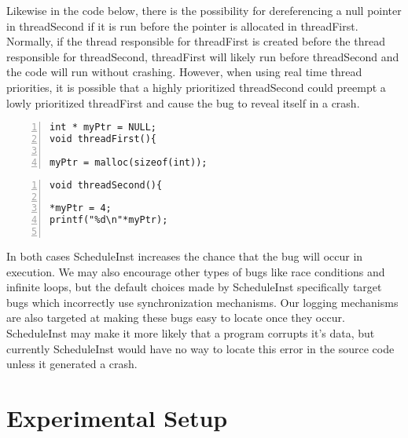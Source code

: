 \documentclass[10pt,]{article} %
\begin{document}
Likewise in the code below, there is the possibility for dereferencing a null pointer in threadSecond if it is run before the pointer is allocated in threadFirst.  Normally, if the thread responsible for threadFirst is created before the thread responsible for threadSecond, threadFirst will likely run before threadSecond and the code will run without crashing.  However, when using real time thread priorities, it is possible that a highly prioritized threadSecond could preempt a lowly prioritized threadFirst and cause the bug to reveal itself in a crash. 

\begin{minipage}[b]{0.45\linewidth}
\centering
\lstset{language=C,label=SliceExaple}
\begin{lstlisting}[frame=single,numbers=left, mathescape,%
  title={Bad Memory Access Thread 1}, label=scopesEnteredContents]
int * myPtr = NULL;
void threadFirst(){

myPtr = malloc(sizeof(int));
\end{lstlisting}
\end{minipage}
\hspace{0.5cm}
\begin{minipage}[b]{0.45\linewidth}
\centering
\begin{lstlisting}[frame=single,numbers=left, mathescape,%
  title={Bad Memory Access Thread 2}, label=scopesEnteredContents]
void threadSecond(){

*myPtr = 4;
printf("%d\n"*myPtr);


\end{lstlisting}
\end{minipage}
In both cases ScheduleInst increases the chance that the bug will occur in execution.  We may also encourage other types of bugs like race conditions and infinite loops, but the default choices made by ScheduleInst specifically target bugs which incorrectly use synchronization mechanisms. Our logging mechanisms are also targeted at making these bugs easy to locate once they occur.  ScheduleInst may make it more likely that a program corrupts it’s data, but currently ScheduleInst would have no way to locate this error in the source code unless it generated a crash.







\section{Experimental Setup}
\end{document}
